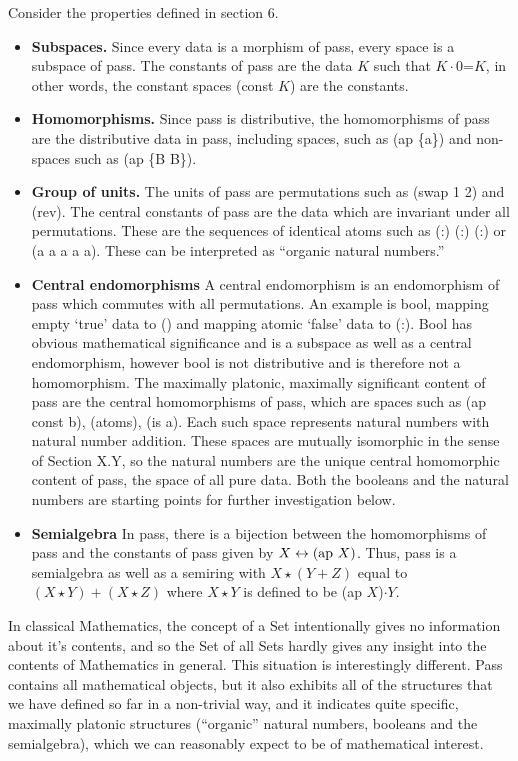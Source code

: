 \documentclass[11pt]{article}
\begin{document}
Consider the properties defined in section 6.  
\begin{itemize}
\item{{\bf Subspaces.}  Since every data is a morphism of pass, every space is a subspace of pass.  The constants of pass are the data $K$ such that 
$K\cdot 0$=$K$, in other words, the constant spaces (const $K$) are the constants.}
\item{{\bf Homomorphisms.} Since pass is distributive, the homomorphisms of pass are the distributive data in pass, including spaces, such as (ap \{a\}) 
and non-spaces such as (ap \{B B\}).} 
\item{{\bf Group of units.} The units of pass are permutations such as (swap 1 2) and (rev).  The central constants of pass are the data which 
are invariant under all permutations.  These are the sequences of identical atoms such as (:) (:) (:) or (a a a a a).  These can be interpreted as ``organic natural numbers.''}
\item{{\bf Central endomorphisms} A central endomorphism is an endomorphism of pass which commutes with all permutations.  An example  
is bool, mapping empty `true' data to () and mapping atomic `false' data to (:).  Bool has obvious mathematical significance and is a subspace 
as well as a central endomorphism, however bool is not distributive and is therefore not a homomorphism.  The maximally platonic, maximally 
significant content of pass are the central homomorphisms of pass, which are spaces such as (ap const b), (atoms), (is a).  Each such 
space represents natural numbers with natural number addition.  These spaces are mutually isomorphic in the sense of Section X.Y, 
so the natural numbers are the unique central homomorphic content of pass, the space of all pure data.  Both the booleans and the natural numbers are 
starting points for further investigation below.}
\item{{\bf Semialgebra} In pass, there is a bijection between the homomorphisms of pass and the constants of pass given by $X\leftrightarrow ({\rm ap}\ X)$.  Thus,
pass is a semialgebra as well as a semiring with $X\star (Y+Z)$ equal to $(X\star Y)+(X\star Z)$ where $X\star Y$ is defined to be (ap $X$)$\cdot Y$.}
\end{itemize}

In classical Mathematics, the concept of a Set intentionally gives no information about it's contents, and so the Set of all Sets hardly gives any insight 
into the contents of Mathematics in general.  This situation is interestingly different.  Pass contains all mathematical objects, but it also exhibits all 
of the structures that we have defined so far in a non-trivial way, and it indicates quite specific, maximally platonic structures (``organic'' natural numbers, booleans and the semialgebra), which we can reasonably expect to be of mathematical interest. 
\end{document}

